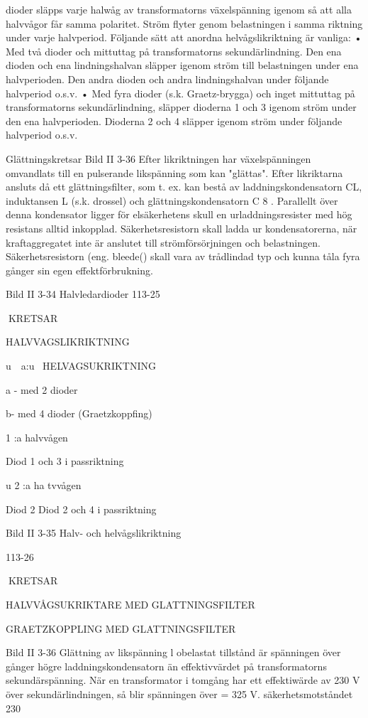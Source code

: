 dioder släpps varje halwåg av transformatorns växelspänning igenom så att alla halvvågor får samma polaritet. Ström flyter genom belastningen i samma riktning under
varje halvperiod. Följande sätt att anordna
helvågslikriktning är vanliga:
• Med två dioder och mittuttag på transformatorns sekundärlindning. Den ena dioden och ena lindningshalvan släpper igenom ström till belastningen under ena halvperioden. Den andra dioden och andra
lindningshalvan under följande halvperiod
o.s.v.
• Med fyra dioder (s.k. Graetz-brygga) och
inget mittuttag på transformatorns sekundärlindning, släpper dioderna 1 och 3 igenom ström under den ena halvperioden.
Dioderna 2 och 4 släpper igenom ström
under följande halvperiod o.s.v.

Glättningskretsar
Bild II 3-36
Efter likriktningen har växelspänningen omvandlats till en pulserande likspänning som
kan "glättas". Efter likriktarna ansluts då ett
glättningsfilter, som t. ex. kan bestå av laddningskondensatorn CL, induktansen L (s.k.
drossel) och glättningskondensatorn C 8 .
Parallellt över denna kondensator ligger för
elsäkerhetens skull en urladdningsresister
med hög resistans alltid inkopplad.
Säkerhetsresistorn skall ladda ur kondensatorerna, när kraftaggregatet inte är
anslutet till strömförsörjningen och belastningen. Säkerhetsresistorn (eng. bleede()
skall vara av trådlindad typ och kunna tåla
fyra gånger sin egen effektförbrukning.

Bild II 3-34 Halvledardioder
113-25

KRETSAR

HALVVAGSLIKRIKTNING

u~~a:u~
HELVAGSUKRIKTNING

a - med 2 dioder

b- med 4 dioder
(Graetzkoppfing)

1 :a halvvågen

Diod 1 och 3 i passriktning

u
2 :a ha tvvågen

Diod 2 Diod 2 och 4 i passriktning

Bild II 3-35 Halv- och helvågslikriktning

113-26

KRETSAR

HALVVÅGSUKRIKTARE MED GLATTNINGSFILTER

GRAETZKOPPLING MED GLATTNINGSFILTER

Bild II 3-36 Glättning av likspänning
l obelastat tillstånd är spänningen över
gånger högre
laddningskondensatorn
än effektivvärdet på transformatorns sekundärspänning. När en transformator i tomgång har ett effektiwärde av 230 V över
sekundärlindningen, så blir spänningen över
= 325 V.
säkerhetsmotståndet 230

